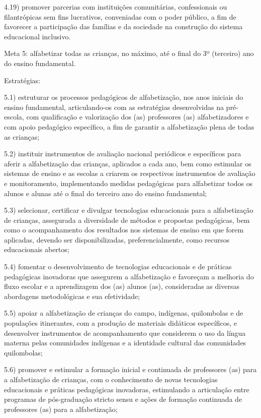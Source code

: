 \documentclass[
]{book}
\begin{document}
4.19) promover parcerias com instituições comunitárias, confessionais ou filantrópicas sem fins lucrativos, conveniadas com o poder público, a fim de favorecer a participação das famílias e da sociedade na construção do sistema educacional inclusivo.

Meta 5: alfabetizar todas as crianças, no máximo, até o final do 3º (terceiro) ano do ensino fundamental.

Estratégias:

5.1) estruturar os processos pedagógicos de alfabetização, nos anos iniciais do ensino fundamental, articulando-os com as estratégias desenvolvidas na pré-escola, com qualificação e valorização dos (as) professores (as) alfabetizadores e com apoio pedagógico específico, a fim de garantir a alfabetização plena de todas as crianças;

5.2) instituir instrumentos de avaliação nacional periódicos e específicos para aferir a alfabetização das crianças, aplicados a cada ano, bem como estimular os sistemas de ensino e as escolas a criarem os respectivos instrumentos de avaliação e monitoramento, implementando medidas pedagógicas para alfabetizar todos os alunos e alunas até o final do terceiro ano do ensino fundamental;

5.3) selecionar, certificar e divulgar tecnologias educacionais para a alfabetização de crianças, assegurada a diversidade de métodos e propostas pedagógicas, bem como o acompanhamento dos resultados nos sistemas de ensino em que forem aplicadas, devendo ser disponibilizadas, preferencialmente, como recursos educacionais abertos;

5.4) fomentar o desenvolvimento de tecnologias educacionais e de práticas pedagógicas inovadoras que assegurem a alfabetização e favoreçam a melhoria do fluxo escolar e a aprendizagem dos (as) alunos (as), consideradas as diversas abordagens metodológicas e sua efetividade;

5.5) apoiar a alfabetização de crianças do campo, indígenas, quilombolas e de populações itinerantes, com a produção de materiais didáticos específicos, e desenvolver instrumentos de acompanhamento que considerem o uso da língua materna pelas comunidades indígenas e a identidade cultural das comunidades quilombolas;

5.6) promover e estimular a formação inicial e continuada de professores (as) para a alfabetização de crianças, com o conhecimento de novas tecnologias educacionais e práticas pedagógicas inovadoras, estimulando a articulação entre programas de pós-graduação stricto sensu e ações de formação continuada de professores (as) para a alfabetização;
\end{document}
